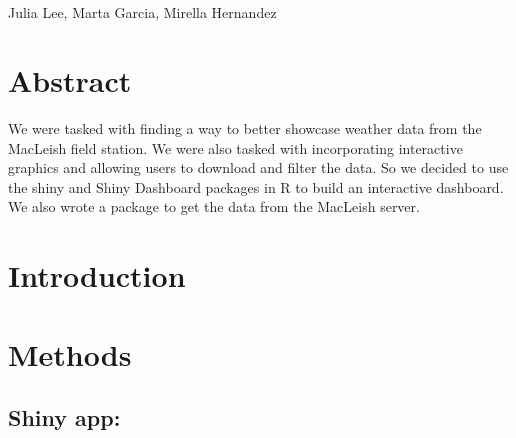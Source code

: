 \documentclass[10pt,letterpaper]{article}
\begin{document}
\vspace*{0.2in}

\begin{flushleft}
{\Large
\textbf{} %
}
\newline
\\
Julia Lee\textsuperscript{},
Marta Garcia\textsuperscript{},
Mirella Hernandez\textsuperscript{}\\
\bigskip
\bigskip
\end{flushleft}
\section*{Abstract}
We were tasked with finding a way to better showcase weather data from
the MacLeish field station. We were also tasked with incorporating
interactive graphics and allowing users to download and filter the data.
So we decided to use the shiny and Shiny Dashboard packages in R to
build an interactive dashboard. We also wrote a package to get the data
from the MacLeish server.


\linenumbers

\section{Introduction}\label{introduction}

\section{Methods}\label{methods}

\subsection{Shiny app:}\label{shiny-app}
\end{document}
